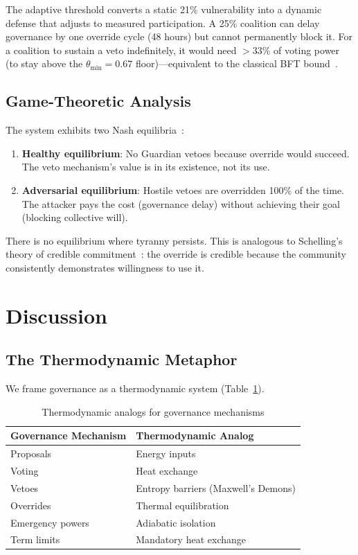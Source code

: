 \documentclass[11pt,a4paper]{article}
\begin{document}
\noindent The adaptive threshold converts a static 21\% vulnerability into a dynamic defense that adjusts to measured participation. A 25\% coalition can delay governance by one override cycle (48 hours) but cannot permanently block it. For a coalition to sustain a veto indefinitely, it would need $> 33\%$ of voting power (to stay above the $\theta_{\min} = 0.67$ floor)---equivalent to the classical BFT bound~\cite{castro}.

\subsection{Game-Theoretic Analysis}

The system exhibits two Nash equilibria~\cite{nash}:

\begin{enumerate}
    \item \textbf{Healthy equilibrium}: No Guardian vetoes because override would succeed. The veto mechanism's value is in its existence, not its use.
    \item \textbf{Adversarial equilibrium}: Hostile vetoes are overridden 100\% of the time. The attacker pays the cost (governance delay) without achieving their goal (blocking collective will).
\end{enumerate}

\noindent There is no equilibrium where tyranny persists. This is analogous to Schelling's theory of credible commitment~\cite{schelling}: the override is credible because the community consistently demonstrates willingness to use it.

\section{Discussion}
\label{sec:discussion}

\subsection{The Thermodynamic Metaphor}

We frame governance as a thermodynamic system (Table~\ref{tab:thermo}).

\begin{table}[h]
\centering
\caption{Thermodynamic analogs for governance mechanisms}
\label{tab:thermo}
\begin{tabular}{ll}
\toprule
\textbf{Governance Mechanism} & \textbf{Thermodynamic Analog} \\
\midrule
Proposals & Energy inputs \\
Voting & Heat exchange \\
Vetoes & Entropy barriers (Maxwell's Demons) \\
Overrides & Thermal equilibration \\
Emergency powers & Adiabatic isolation \\
Term limits & Mandatory heat exchange \\
\bottomrule
\end{tabular}
\end{table}
\end{document}

